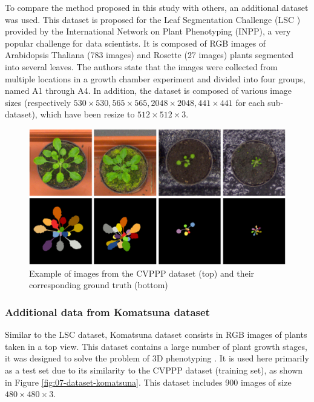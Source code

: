 \documentclass[../thesis.tex]{subfiles}
\begin{document}
    To compare the method proposed in this study with others, an additional dataset was used. This dataset is proposed for the Leaf Segmentation Challenge (LSC \cite{scharr2017computer})  provided by the International Network on Plant Phenotyping (INPP), a very popular challenge for data scientists. It is composed of RGB images of Arabidopsis Thaliana (783 images) and Rosette (27 images) plants segmented into several leaves. The authors state that the images were collected from multiple locations in a growth chamber experiment and divided into four groups, named A1 through A4. In addition, the dataset is composed of various image sizes (respectively $530 \times 530, 565 \times 565, 2048 \times 2048, 441 \times 441$ for each sub-dataset), which have been resize to $512 \times 512 \times 3$. %
    
    \begin{figure}[H]
        \centering
        \includegraphics[width=0.7\linewidth]{img/leaf/dataset-cvppp}
        \caption{Example of images from the CVPPP dataset (top) and their corresponding ground truth (bottom)}
        \label{fig:07-dataset-cvppp}
    \end{figure}
    
    
    \subsubsection{Additional data from Komatsuna dataset}
    \label{sec:komatsuna-dataset}
    
    Similar to the LSC dataset, Komatsuna dataset consists in RGB images of plants taken in a top view. This dataset contains a large number of plant growth stages, it was designed to solve the problem of 3D phenotyping \cite{Uchiyama_2017_ICCV_Workshops}. It is used here primarily as a test set due to its similarity to the CVPPP dataset (training set), as shown in Figure \ref{fig:07-dataset-komatsuna}. This dataset includes 900 images of size $480 \times 480 \times 3$. %
    
\end{document}
